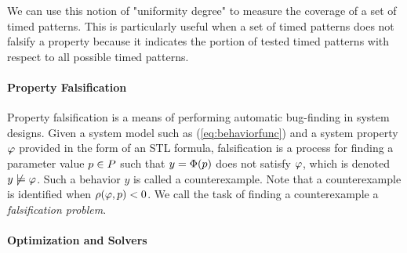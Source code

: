 We can use this notion of "uniformity degree" to measure the coverage of a set of timed patterns. This is particularly useful when a set of timed patterns does not  falsify a property because it indicates the portion of tested timed patterns with respect to all possible timed patterns.




\paragraph{Property Falsification}	

Property falsification is a means of performing automatic bug-finding in system designs.
Given a system model such as (\ref{eq:behaviorfunc}) and a system property $\varphi$ provided in the form of an STL formula, 
falsification is a process for finding a parameter value $p \in P$
such that $y=\Phi(p)$ does not satisfy $\varphi$, which is denoted $y
\not\models \varphi$. Such a behavior $y$ is called a counterexample. 
Note that a counterexample is identified when 
$\rho(\varphi,p)<0$. We call the task of finding a counterexample 
a {\em falsification problem}. 

\paragraph{Optimization and Solvers}	

